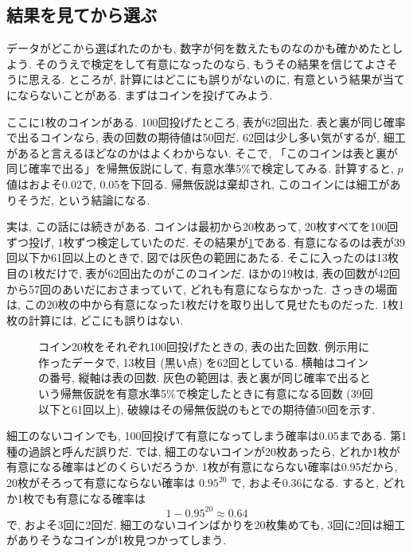   \subsection{結果を見てから選ぶ}

    データがどこから選ばれたのかも, 数字が何を数えたものなのかも確かめたとしよう.
    そのうえで検定をして有意になったのなら, もうその結果を信じてよさそうに思える.
    ところが, 計算にはどこにも誤りがないのに, 有意という結果が当てにならないことがある.
    まずはコインを投げてみよう.

    ここに1枚のコインがある.
    100回投げたところ, 表が62回出た.
    表と裏が同じ確率で出るコインなら, 表の回数の期待値は50回だ.
    62回は少し多い気がするが, 細工があると言えるほどなのかはよくわからない.
    そこで, 「このコインは表と裏が同じ確率で出る」を帰無仮説にして, 有意水準5\%で検定してみる.
    計算すると, $p$値はおよそ0.02で, 0.05を下回る.
    帰無仮説は棄却され, このコインには細工がありそうだ, という結論になる.

    実は, この話には続きがある.
    コインは最初から20枚あって, 20枚すべてを100回ずつ投げ, 1枚ずつ検定していたのだ.
    その結果が\cref{fig:ch07-coins}である.
    有意になるのは表が39回以下か61回以上のときで, 図では灰色の範囲にあたる.
    そこに入ったのは13枚目の1枚だけで, 表が62回出たのがこのコインだ.
    ほかの19枚は, 表の回数が42回から57回のあいだにおさまっていて, どれも有意にならなかった.
    さっきの場面は, この20枚の中から有意になった1枚だけを取り出して見せたものだった.
    1枚1枚の計算には, どこにも誤りはない.

    \begin{figure}[htbp]
      \centering
      
      \caption{コイン20枚をそれぞれ100回投げたときの, 表の出た回数. 例示用に作ったデータで, 13枚目 (黒い点) を62回としている. 横軸はコインの番号, 縦軸は表の回数. 灰色の範囲は, 表と裏が同じ確率で出るという帰無仮説を有意水準5\%で検定したときに有意になる回数 (39回以下と61回以上), 破線はその帰無仮説のもとでの期待値50回を示す.}
      \label{fig:ch07-coins}
    \end{figure}

    細工のないコインでも, 100回投げて有意になってしまう確率は0.05まである.
    第1種の過誤と呼んだ誤りだ.
    では, 細工のないコインが20枚あったら, どれか1枚が有意になる確率はどのくらいだろうか.
    1枚が有意にならない確率は0.95だから, 20枚がそろって有意にならない確率は $0.95^{20}$ で, およそ0.36になる.
    すると, どれか1枚でも有意になる確率は
    \[
      1 - 0.95^{20} \approx 0.64
    \]
    で, およそ3回に2回だ.
    細工のないコインばかりを20枚集めても, 3回に2回は細工がありそうなコインが1枚見つかってしまう.

